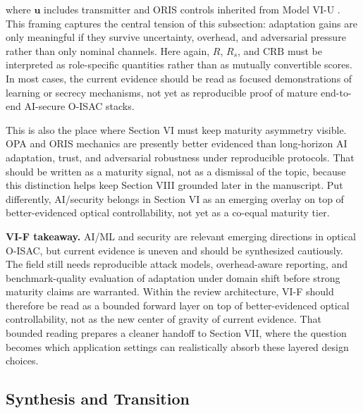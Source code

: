 \documentclass[lettersize,journal]{IEEEtran}
\begin{document}
where $\mathbf{u}$ includes transmitter and ORIS controls inherited from Model VI-U \cite{O_ISAC_127,O_ISAC_145,O_ISAC_163}. This framing captures the central tension of this subsection: adaptation gains are only meaningful if they survive uncertainty, overhead, and adversarial pressure rather than only nominal channels. Here again, $R$, $R_s$, and $\mathrm{CRB}$ must be interpreted as role-specific quantities rather than as mutually convertible scores. In most cases, the current evidence should be read as focused demonstrations of learning or secrecy mechanisms, not yet as reproducible proof of mature end-to-end AI-secure O-ISAC stacks.

This is also the place where Section VI must keep maturity asymmetry visible. OPA and ORIS mechanics are presently better evidenced than long-horizon AI adaptation, trust, and adversarial robustness under reproducible protocols. That should be written as a maturity signal, not as a dismissal of the topic, because this distinction helps keep Section VIII grounded later in the manuscript. Put differently, AI/security belongs in Section VI as an emerging overlay on top of better-evidenced optical controllability, not yet as a co-equal maturity tier.

\textbf{VI-F takeaway.} AI/ML and security are relevant emerging directions in optical O-ISAC, but current evidence is uneven and should be synthesized cautiously. The field still needs reproducible attack models, overhead-aware reporting, and benchmark-quality evaluation of adaptation under domain shift before strong maturity claims are warranted. Within the review architecture, VI-F should therefore be read as a bounded forward layer on top of better-evidenced optical controllability, not as the new center of gravity of current evidence. That bounded reading prepares a cleaner handoff to Section VII, where the question becomes which application settings can realistically absorb these layered design choices.

\subsection{Synthesis and Transition}
\end{document}
